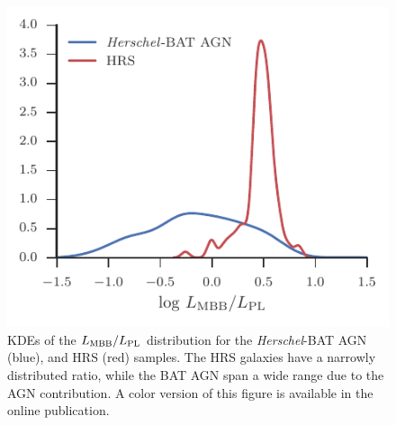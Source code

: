 \documentclass[fleqn, usenatbib]{mnras}
\newcommand{\herschel}{\emph{Herschel}}
\begin{document}


\begin{figure}
\includegraphics[width=\columnwidth]{figures/lmbb-lpl-ratio-hrs-mass-select}
\caption{KDEs of the $L_{\rm MBB}/L_{\rm PL}$ distribution for the \herschel-BAT AGN (blue), and HRS (red) samples. The HRS galaxies have a narrowly distributed ratio, while the BAT AGN span a wide range due to the AGN contribution. A color version of this figure is available in the online publication. \label{fig:lmbb_lpl_ratio}}
\end{figure}
\end{document}

